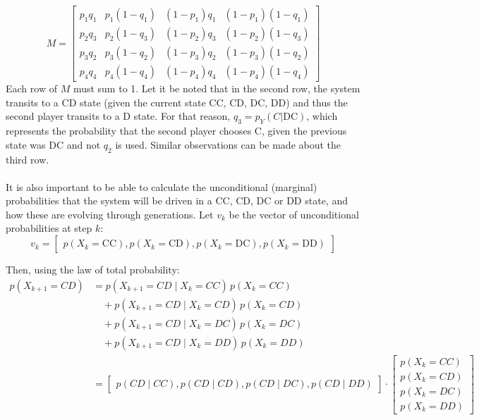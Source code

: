 \documentclass[12pt]{report}
\begin{document}
\[
M =
\begin{bmatrix}
p_1 q_1 & p_1 (1 - q_1) & (1 - p_1) q_1 & (1 - p_1)(1 - q_1) \\
p_2 q_3 & p_2 (1 - q_3) & (1 - p_2) q_3 & (1 - p_2)(1 - q_3) \\
p_3 q_2 & p_3 (1 - q_2) & (1 - p_3) q_2 & (1 - p_3)(1 - q_2) \\
p_4 q_4 & p_4 (1 - q_4) & (1 - p_4) q_4 & (1 - p_4)(1 - q_4)
\end{bmatrix}
\]
Each row of \( M \) must sum to 1. Let it be noted that in the second row, the system transits to a CD state (given the current state CC, CD, DC, DD) and thus the second player transits to a D state. For that reason, \(
q_3 = p_Y(C|\text{DC}) 
\), which represents the probability that the second player chooses C, given the previous state was DC and not  \(
q_2 
\)  is used. Similar observations can be made about the third row.
\\\\
It is also important to be able to calculate the unconditional (marginal) probabilities that the system will be driven in a CC, CD, DC or DD state, and how these are evolving through generations. 
Let \( v_k \) be the vector of unconditional probabilities at step \( k \):
\[
v_k = \begin{bmatrix}
p(X_k = \text{CC}) ,  p(X_k = \text{CD}) ,  p(X_k = \text{DC}) ,  p(X_k = \text{DD})
\end{bmatrix}
\]

Then, using the law of total probability: \[
\begin{aligned}
p(X_{k+1} = CD) &= p(X_{k+1} = CD \mid X_k = CC) \, p(X_k = CC) \\
&\quad + p(X_{k+1} = CD \mid X_k = CD) \, p(X_k = CD) \\
&\quad + p(X_{k+1} = CD \mid X_k = DC) \, p(X_k = DC) \\
&\quad + p(X_{k+1} = CD \mid X_k = DD) \, p(X_k = DD) \\
&= 
\begin{bmatrix}
p(CD \mid CC) , p(CD \mid CD) , p(CD \mid DC) , p(CD \mid DD)
\end{bmatrix}
\cdot
\begin{bmatrix}
p(X_k = CC) \\
p(X_k = CD) \\
p(X_k = DC) \\
p(X_k = DD)
\end{bmatrix}
\end{aligned}
\]
\end{document}
